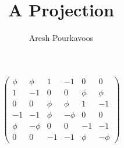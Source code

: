 \documentclass{article}
\begin{document}
\title{A Projection}
\author{Aresh Pourkavoos}
\maketitle

\[
\begin{pmatrix}
  \phi & \phi & 1 & -1 & 0 & 0 \\
  1 & -1 & 0 & 0 & \phi & \phi \\
  0 & 0 & \phi & \phi & 1 & -1 \\
  -1 & -1 & \phi & -\phi & 0 & 0 \\
  \phi & -\phi & 0 & 0 & -1 & -1 \\
  0 & 0 & -1 & -1 & \phi & -\phi
\end{pmatrix}
\]
\end{document}
